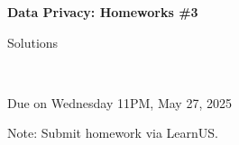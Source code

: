 \documentclass[12pt]{article}
\begin{document}
\begin{center}
{\bf Data Privacy: Homeworks \#3 \begin{solution}Solutions\end{solution}}\\ \medskip
\begin{problem}Due on Wednesday 11PM, May 27, 2025 \end{problem}
\end{center}

\begin{problem}
\noindent 
Note: Submit homework via LearnUS.
\end{problem}

\begin{solution}
\end{solution}
\end{document}
